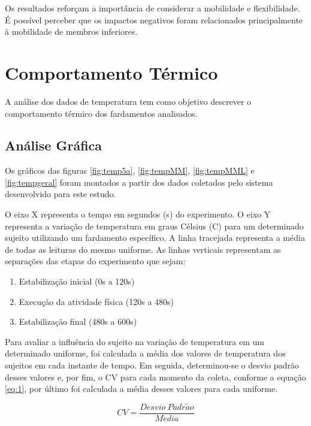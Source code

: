         \tab Os resultados reforçam a importância de considerar a mobilidade e flexibilidade. 
        É possível perceber que os impactos negativos foram relacionados principalmente à 
        mobilidade de membros inferiores.

\section{Comportamento Térmico}
    A análise dos dados de temperatura tem como objetivo descrever o comportamento térmico dos fardamentos analisados.

    \subsection{Análise Gráfica}
        Os gráficos das figuras \ref{fig:temp5a}, \ref{fig:tempMM}, \ref{fig:tempMML} e \ref{fig:tempgeral} foram montados
        a partir dos dados coletados pelo sistema desenvolvido para este estudo. 

        O eixo X representa o tempo em segundos (s) do experimento. O eixo Y representa a variação de temperatura em graus Célsius (\degree C) para um 
        determinado sujeito utilizando um fardamento específico. A linha tracejada representa a 
        média de todas as leituras do mesmo uniforme. As linhas verticais representam as separações das etapas
        do experimento que sejam: 
        \begin{enumerate}[label=\Roman*.] %
            \item Estabilização inicial (0s a 120s)
            \item Execução da atividade física (120s a 480s)
            \item Estabilização final (480s a 600s)
            \end{enumerate}
        

        Para avaliar a influência do sujeito na variação de temperatura em um determinado uniforme, foi 
        calculada a média dos valores de temperatura dos sujeitos em cada instante de tempo. Em seguida, 
        determinou-se o desvio padrão desses valores e, por fim, o \acrlong{CV} para cada momento da 
        coleta, conforme a equação \ref{eq:1}, por último foi calculada a média desses valores para cada 
        uniforme.

        \begin{equation} 
            \label{eq:1}CV=\frac{Desvio~Padr\tilde{a}o}{M\acute{e}dia}
            \end{equation}

